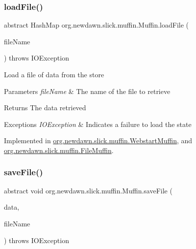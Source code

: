 \subsubsection{\texorpdfstring{load\+File()}{loadFile()}}
{\footnotesize\ttfamily abstract Hash\+Map org.\+newdawn.\+slick.\+muffin.\+Muffin.\+load\+File (\begin{DoxyParamCaption}\item[{String}]{file\+Name }\end{DoxyParamCaption}) throws I\+O\+Exception\hspace{0.3cm}{\ttfamily [abstract]}}

Load a file of data from the store


\begin{DoxyParams}{Parameters}
{\em file\+Name} & The name of the file to retrieve \\
\hline
\end{DoxyParams}
\begin{DoxyReturn}{Returns}
The data retrieved 
\end{DoxyReturn}

\begin{DoxyExceptions}{Exceptions}
{\em I\+O\+Exception} & Indicates a failure to load the state \\
\hline
\end{DoxyExceptions}


Implemented in \mbox{\hyperlink{classorg_1_1newdawn_1_1slick_1_1muffin_1_1_webstart_muffin_a671e964aa3e400ae2c9d2a4d6a9ebeef}{org.\+newdawn.\+slick.\+muffin.\+Webstart\+Muffin}}, and \mbox{\hyperlink{classorg_1_1newdawn_1_1slick_1_1muffin_1_1_file_muffin_a5db97db7631d95ba851f1d4d81ed3825}{org.\+newdawn.\+slick.\+muffin.\+File\+Muffin}}.

\mbox{\label{interfaceorg_1_1newdawn_1_1slick_1_1muffin_1_1_muffin_a025189130fb123bc751e58677435974a}} 
\subsubsection{\texorpdfstring{save\+File()}{saveFile()}}
{\footnotesize\ttfamily abstract void org.\+newdawn.\+slick.\+muffin.\+Muffin.\+save\+File (\begin{DoxyParamCaption}\item[{Hash\+Map}]{data,  }\item[{String}]{file\+Name }\end{DoxyParamCaption}) throws I\+O\+Exception\hspace{0.3cm}{\ttfamily [abstract]}}

